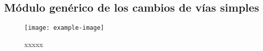 \subsection{Módulo genérico de los cambios de vías simples}

\lipsum[1]

\begin{figure}[H]
	\centering
	\texttt{[image: example-image]}
	\centering\caption{xxxxx}
	\label{fig:XXXX}
\end{figure}

\lipsum[1]